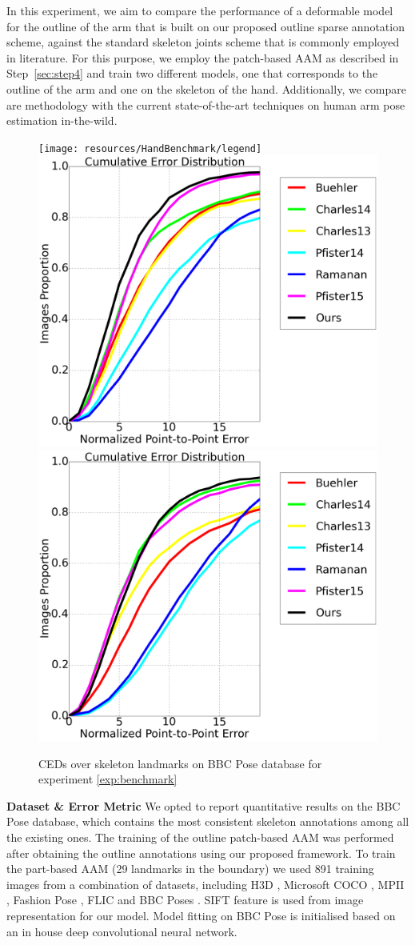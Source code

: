 In this experiment, we aim to compare the performance of a deformable model for the outline of the arm that is built on our proposed outline sparse annotation scheme, against the standard skeleton joints scheme that is commonly employed in literature. For this purpose, we employ the patch-based AAM as described in Step~\ref{sec:step4} and train two different models, one that corresponds to the outline of the arm and one on the skeleton of the hand.  Additionally, we compare are methodology with the current state-of-the-art techniques on human arm pose estimation in-the-wild.


\begin{figure}[b!]
    \centering
    \texttt{[image: resources/HandBenchmark/legend]}
    \\
    \includegraphics[width=0.48\columnwidth]{resources/HandBenchmark/wrist}
    \includegraphics[width=0.48\columnwidth]{resources/HandBenchmark/elbow}
    \caption{CEDs over skeleton landmarks on BBC Pose database for experiment \ref{exp:benchmark}}
    \label{fig:hand_benchmark}
\end{figure}


\noindent\textbf{Dataset \& Error Metric} We opted to report quantitative results on the BBC Pose\cite{pfister2015flowing} database, which contains the most consistent skeleton annotations among all the existing ones. The training of the outline patch-based AAM was performed after obtaining the outline annotations using our proposed framework. To train the part-based AAM (29 landmarks in the boundary) we used 891 training images from a combination of datasets, including H3D \cite{PoseletsICCV09}, Microsoft COCO \cite{lin2014microsoft}, MPII \cite{andriluka14cvpr}, Fashion Pose \cite{dantone2013human}, FLIC \cite{sapp2013modec} and BBC Poses \cite{pfister2015flowing}. SIFT \cite{PoseletsICCV09} feature is used from image representation for our model. Model fitting on BBC Pose is initialised based on an in house deep convolutional neural network.

